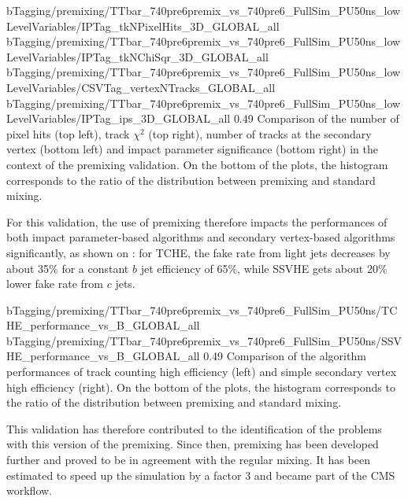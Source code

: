                       {bTagging/premixing/TTbar_740pre6premix_vs_740pre6_FullSim_PU50ns_lowLevelVariables/IPTag_tkNPixelHits_3D_GLOBAL_all}
                      {bTagging/premixing/TTbar_740pre6premix_vs_740pre6_FullSim_PU50ns_lowLevelVariables/IPTag_tkNChiSqr_3D_GLOBAL_all}
                      {bTagging/premixing/TTbar_740pre6premix_vs_740pre6_FullSim_PU50ns_lowLevelVariables/CSVTag_vertexNTracks_GLOBAL_all}
                      {bTagging/premixing/TTbar_740pre6premix_vs_740pre6_FullSim_PU50ns_lowLevelVariables/IPTag_ips_3D_GLOBAL_all}
                      {0.49}
                      {Comparison of the number of pixel hits (top left), track
                      $\chi^2$ (top right), number of tracks at the secondary
                      vertex (bottom left) and impact parameter significance
                      (bottom right) in the context of the premixing validation.
                      On the bottom of the plots, the histogram corresponds to
                      the ratio of the distribution between premixing and
                      standard mixing. }

    For this validation, the use of premixing therefore impacts the performances
    of both impact parameter-based algorithms and  secondary vertex-based
    algorithms significantly, as shown on
    : for TCHE, the fake rate from
    light jets decreases by about 35\% for a constant $b$ jet efficiency of
    65\%, while SSVHE gets about 20\% lower fake rate from $c$ jets.

                     {bTagging/premixing/TTbar_740pre6premix_vs_740pre6_FullSim_PU50ns/TCHE_performance_vs_B_GLOBAL_all}
                     {bTagging/premixing/TTbar_740pre6premix_vs_740pre6_FullSim_PU50ns/SSVHE_performance_vs_B_GLOBAL_all}
                     {0.49}
                     {Comparison of the algorithm performances of track counting
                     high efficiency (left) and simple secondary vertex high
                     efficiency (right).  On the bottom of the plots, the
                     histogram corresponds to the ratio of the distribution
                     between premixing and standard mixing. }

    This validation has therefore contributed to the identification of the
    problems with this version of the premixing. Since then, premixing has been
    developed further and proved to be in agreement with the regular mixing. It
    has been estimated to speed up the simulation by a factor 3 \cite{Premixing}
    and became part of the CMS workflow.

